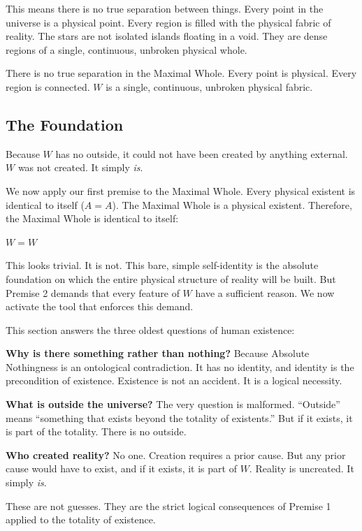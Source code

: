 \documentclass[11pt]{article}
\theoremstyle{canonstyle}
\begin{document}
This means there is no true separation between things. Every point in the universe is a physical point. Every region is filled with the physical fabric of reality. The stars are not isolated islands floating in a void. They are dense regions of a single, continuous, unbroken physical whole.

\begin{keyresult}
There is no true separation in the Maximal Whole. Every point is physical. Every region is connected. $W$ is a single, continuous, unbroken physical fabric.
\end{keyresult}

\subsection{The Foundation}

Because $W$ has no outside, it could not have been created by anything external. $W$ was not created. It simply \emph{is}.

We now apply our first premise to the Maximal Whole. Every physical existent is identical to itself ($A=A$). The Maximal Whole is a physical existent. Therefore, the Maximal Whole is identical to itself:

\begin{keyresult}
$W = W$
\end{keyresult}

This looks trivial. It is not. This bare, simple self-identity is the absolute foundation on which the entire physical structure of reality will be built. But Premise 2 demands that every feature of $W$ have a sufficient reason. We now activate the tool that enforces this demand.

\begin{realization}
This section answers the three oldest questions of human existence:

\medskip

\textbf{Why is there something rather than nothing?}
Because Absolute Nothingness is an ontological contradiction. It has no identity, and identity is the precondition of existence. Existence is not an accident. It is a logical necessity.

\textbf{What is outside the universe?}
The very question is malformed. ``Outside'' means ``something that exists beyond the totality of existents.'' But if it exists, it is part of the totality. There is no outside.

\textbf{Who created reality?}
No one. Creation requires a prior cause. But any prior cause would have to exist, and if it exists, it is part of $W$. Reality is uncreated. It simply \emph{is}.

\medskip

These are not guesses. They are the strict logical consequences of Premise 1 applied to the totality of existence.
\end{realization}
\end{document}
